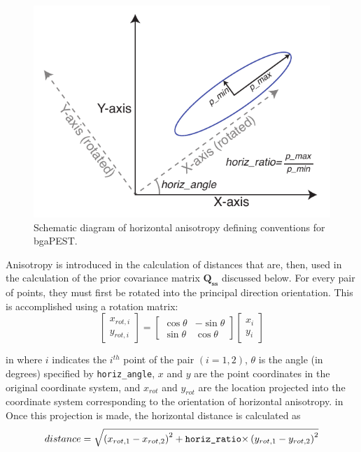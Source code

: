 \documentclass[11pt,oneside,onecolumn]{usgsreport}
\begin{document}
\begin{appendix}
\begin{figure}[!t]
\begin{center}\includegraphics{figures/anisotropy}\end{center}

\caption{\label{fig:anisotropy}Schematic diagram of horizontal anisotropy
defining conventions for bgaPEST. }
\end{figure}


Anisotropy is introduced in the calculation of distances that are,
then, used in the calculation of the prior covariance matrix $\mathbf{Q_{ss}}$
discussed below. For every pair of points, they must first be rotated
into the principal direction orientation. This is accomplished using
a rotation matrix:
\[
\left[\begin{array}{c}
x_{rot,i}\\
y_{rot,i}
\end{array}\right]=\left[\begin{array}{cc}
\cos\theta & -\sin\theta\\
\sin\theta & \cos\theta
\end{array}\right]\left[\begin{array}{c}
x_{i}\\
y_{i}
\end{array}\right]
\]

 in
where $i$ indicates the $i^{th}$ point of the pair $\left(i=1,2\right)$,
$\theta$ is the angle (in degrees) specified by \texttt{horiz\_angle},
$x$ and $y$ are the point coordinates in the original coordinate
system, and $x_{rot}$ and $y_{rot}$ are the location projected into
the coordinate system corresponding to the orientation of horizontal
anisotropy. 
 in
Once this projection is made, the horizontal distance is calculated
as
\[
distance=\sqrt{\left(x_{rot,1}-x_{rot,2}\right)^{2}+\texttt{{horiz\_ratio}\ensuremath{\times}}\left(y_{rot,1}-y_{rot,2}\right)^{2}}
\]



\end{appendix}
\end{document}
